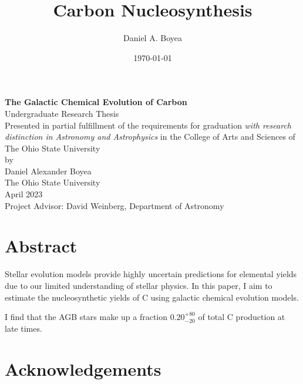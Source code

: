 \documentclass[12pt,oneside]{report}
\title{Carbon Nucleosynthesis}
\author{Daniel A. Boyea}
\date{\today}
\begin{document}


\begin{titlepage}
   \begin{center}
       \vspace*{5\baselineskip}
       \textbf{The Galactic Chemical Evolution of Carbon} \\
       \vspace*{3\baselineskip}
        Undergraduate Research Thesis\\
       \vspace*{3\baselineskip}
    Presented in partial fulfillment of the requirements for graduation \textit{with research distinction in Astronomy and Astrophysics} in the College of Arts and Sciences of The Ohio State University \\
       \vspace*{3\baselineskip}
        by \\
       \vspace*{3\baselineskip}
       {Daniel Alexander Boyea}\\
       \vspace*{3\baselineskip}
       The Ohio State University\\
       April 2023\\
       \vspace*{3\baselineskip}
       Project Advisor: David Weinberg, Department of Astronomy
       \vfill
   \end{center}
\end{titlepage}



\chapter*{Abstract}
Stellar evolution models provide highly uncertain predictions for elemental yields due to our limited understanding of stellar physics. In this paper, I aim to estimate the nucleosynthetic yields of C using galactic chemical evolution models. 

I find that the AGB stars make up a fraction $0.20_{-20}^{+80}$ of total C production at late times. 

\chapter*{Acknowledgements}
\end{document}
